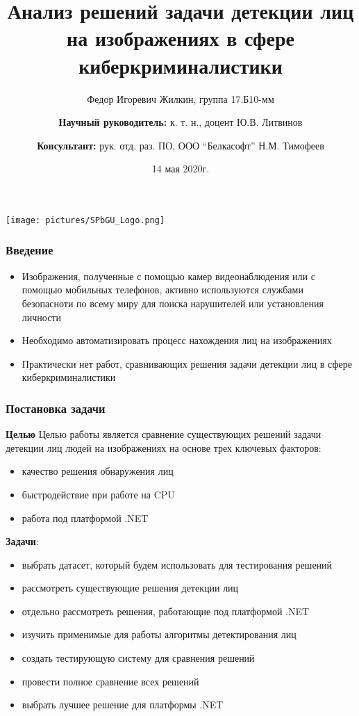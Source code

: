 \documentclass{beamer}
\title[]{Анализ решений задачи детекции лиц на изображениях в сфере киберкриминалистики}
\subtitle[]{}
\institute[СПбГУ]{
Санкт-Петербургский государственный университет \\
Кафедра системного программирования }
\author[Жилкин Федор]{Федор Игоревич Жилкин, группа 17.Б10-мм \\
  \and  
    {\bfseries Научный руководитель:} к. т. н., доцент Ю.В. Литвинов \\ 
  \and
    {\bfseries Консультант:} рук. отд. раз. ПО, ООО “Белкасофт” Н.М.
Тимофеев}
\date{14 мая 2020г.}
\begin{document}
{
\begin{frame}
  \begin{center}
  {\texttt{[image: pictures/SPbGU\_Logo.png]}}
  \end{center}
  \titlepage
\end{frame}
}

\begin{frame}[fragile]
  \transwipe[direction=90]
  \frametitle{Введение}
  \begin{itemize}
    \item Изображения, полученные с помощью камер видеонаблюдения или с помощью мобильных телефонов, активно используются службами безопасноти по всему миру для поиска нарушителей или установления личности 
    \item Необходимо автоматизировать процесс нахождения лиц на изображениях
    \item Практически нет работ, сравнивающих решения задачи детекции лиц в сфере киберкриминалистики
  \end{itemize}
\end{frame}
            


\begin{frame}
  \transwipe[direction=90]
  \frametitle{Постановка задачи}
  \textbf{Целью} Целью работы является сравнение существующих решений
                задачи детекции лиц людей на изображениях на основе трех
                ключевых факторов:
                \begin{itemize}
                    \item качество решения обнаружения лиц
                    \item быстродействие при работе на CPU
                    \item работа под платформой .NET
                \end{itemize}

  \textbf{Задачи}:
  \begin{itemize}
    \item выбрать датасет, который будем использовать для тестирования решений
    \item рассмотреть существующие решения детекции лиц
    \item отдельно рассмотреть решения, работающие под платформой .NET
    \item изучить применимые для работы алгоритмы детектирования лиц
    \item создать тестирующую систему для сравнения решений
    \item провести полное сравнение всех решений
    \item выбрать лучшее решение для платформы .NET
  \end{itemize}
\end{frame}
            
\end{document}
